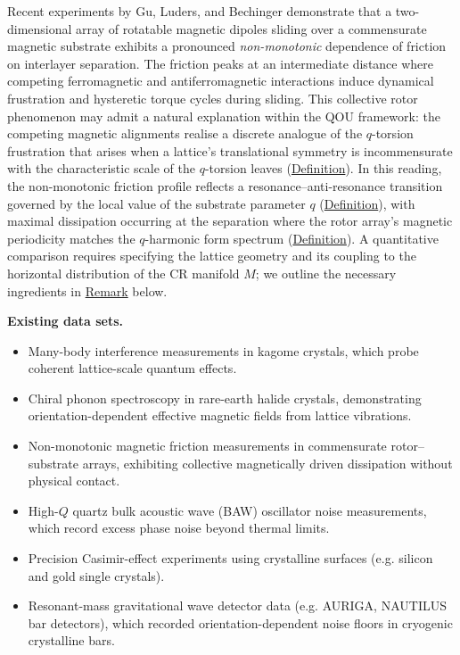 \begin{remark}
  \label{rem:magnetic-friction}
Recent experiments by Gu, Luders, and Bechinger demonstrate
that a two-dimensional array of rotatable magnetic dipoles sliding over a
commensurate magnetic substrate exhibits a pronounced \emph{non-monotonic}
dependence of friction on interlayer separation. The friction peaks at an
intermediate distance where competing ferromagnetic and antiferromagnetic
interactions induce dynamical frustration and hysteretic torque cycles during
sliding. This collective rotor phenomenon may admit a natural explanation
within the QOU framework: the competing magnetic alignments realise a discrete
analogue of the $q$-torsion frustration that arises when a lattice's
translational symmetry is incommensurate with the characteristic scale of the
$q$-torsion leaves (\hyperref[def:q-torsion-leaf]{Definition}). In this reading,
the non-monotonic friction profile reflects a resonance--anti-resonance
transition governed by the local value of the substrate parameter $q$
(\hyperref[def:substrate-parameter]{Definition}), with maximal dissipation occurring
at the separation where the rotor array's magnetic periodicity matches the
$q$-harmonic form spectrum (\hyperref[def:q-harmonic-form]{Definition}). A
quantitative comparison requires specifying the lattice geometry and its
coupling to the horizontal distribution of the CR manifold $M$; we outline
the necessary ingredients in \hyperref[rem:lattice-layout]{Remark} below.
\end{remark}

\textbf{Existing data sets.}

\begin{itemize}
  \item Many-body interference measurements in kagome crystals, which probe coherent lattice-scale quantum effects.
  \item Chiral phonon spectroscopy in rare-earth halide crystals, demonstrating orientation-dependent effective magnetic fields from lattice vibrations.
  \item Non-monotonic magnetic friction measurements in commensurate rotor--substrate arrays, exhibiting collective magnetically driven dissipation without physical contact.
  \item High-$Q$ quartz bulk acoustic wave (BAW) oscillator noise measurements, which record excess phase noise beyond thermal limits.
  \item Precision Casimir-effect experiments using crystalline surfaces (e.g. silicon and gold single crystals).
  \item Resonant-mass gravitational wave detector data (e.g. AURIGA, NAUTILUS bar detectors), which recorded orientation-dependent noise floors in cryogenic crystalline bars.
\end{itemize}


